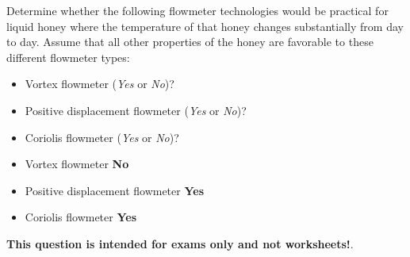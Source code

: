 

Determine whether the following flowmeter technologies would be practical for liquid honey where the temperature of that honey changes substantially from day to day.  Assume that all other properties of the honey are favorable to these different flowmeter types:

\begin{itemize}
\item{} Vortex flowmeter ({\it Yes} or {\it No})?
\vskip 10pt
\item{} Positive displacement flowmeter ({\it Yes} or {\it No})?
\vskip 10pt
\item{} Coriolis flowmeter ({\it Yes} or {\it No})?
\end{itemize}







\begin{itemize}
\item{} Vortex flowmeter {\bf No}
\item{} Positive displacement flowmeter {\bf Yes}
\item{} Coriolis flowmeter {\bf Yes}
\end{itemize}







{\bf This question is intended for exams only and not worksheets!}.



